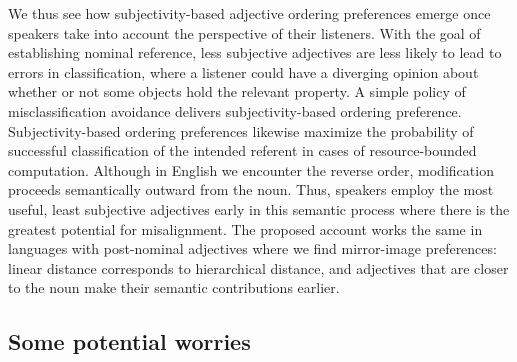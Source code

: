 \documentclass[preprint,authoryear]{elsarticle}\frenchspacing
\begin{document}
%
We thus see how subjectivity-based adjective ordering preferences emerge once speakers take into account the perspective of their listeners. With the goal of establishing nominal reference, less subjective adjectives are less likely to lead to errors in classification, where a listener could have a diverging opinion about whether or not some objects hold the relevant property. A simple policy of misclassification avoidance delivers subjectivity-based ordering preference. 
Subjectivity-based ordering preferences likewise maximize the probability of successful classification of the intended referent in cases of resource-bounded computation. 
Although in English we encounter the reverse order, modification proceeds semantically outward from the noun. Thus, speakers employ the most useful, least subjective adjectives early in this semantic process where there is the greatest potential for misalignment. %
The proposed account works the same in languages with post-nominal adjectives where we find mirror-image preferences: linear distance corresponds to hierarchical distance, and adjectives that are closer to the noun make their semantic contributions earlier.



\subsection{Some potential worries}
\end{document}

